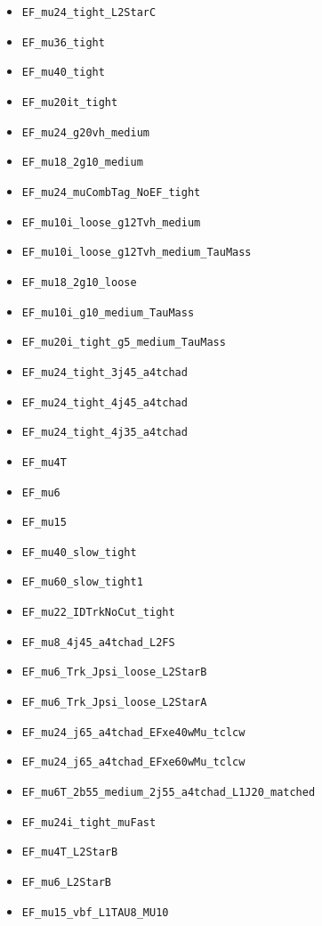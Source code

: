 \begin{itemize}
\item \verb|EF_mu24_tight_L2StarC|
\item \verb|EF_mu36_tight|
\item \verb|EF_mu40_tight|
\item \verb|EF_mu20it_tight|
\item \verb|EF_mu24_g20vh_medium|
\item \verb|EF_mu18_2g10_medium|
\item \verb|EF_mu24_muCombTag_NoEF_tight|
\item \verb|EF_mu10i_loose_g12Tvh_medium|
\item \verb|EF_mu10i_loose_g12Tvh_medium_TauMass|
\item \verb|EF_mu18_2g10_loose|
\item \verb|EF_mu10i_g10_medium_TauMass|
\item \verb|EF_mu20i_tight_g5_medium_TauMass|
\item \verb|EF_mu24_tight_3j45_a4tchad|
\item \verb|EF_mu24_tight_4j45_a4tchad|
\item \verb|EF_mu24_tight_4j35_a4tchad|
\item \verb|EF_mu4T|
\item \verb|EF_mu6|
\item \verb|EF_mu15|
\item \verb|EF_mu40_slow_tight|
\item \verb|EF_mu60_slow_tight1|
\item \verb|EF_mu22_IDTrkNoCut_tight|
\item \verb|EF_mu8_4j45_a4tchad_L2FS|
\item \verb|EF_mu6_Trk_Jpsi_loose_L2StarB|
\item \verb|EF_mu6_Trk_Jpsi_loose_L2StarA|
\item \verb|EF_mu24_j65_a4tchad_EFxe40wMu_tclcw|
\item \verb|EF_mu24_j65_a4tchad_EFxe60wMu_tclcw|
\item \verb|EF_mu6T_2b55_medium_2j55_a4tchad_L1J20_matched|
\item \verb|EF_mu24i_tight_muFast|
\item \verb|EF_mu4T_L2StarB|
\item \verb|EF_mu6_L2StarB|
\item \verb|EF_mu15_vbf_L1TAU8_MU10|
\end{itemize}
